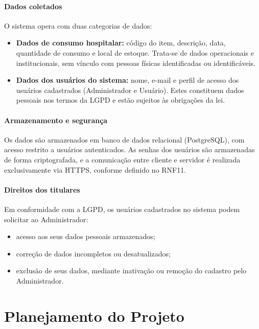 \documentclass[12pt,a4paper]{article}
\begin{document}
\paragraph{Dados coletados}
O sistema opera com duas categorias de dados:

\begin{itemize}
    \item \textbf{Dados de consumo hospitalar:} código do item, descrição,
          data, quantidade de consumo e local de estoque. Trata-se de dados
          operacionais e institucionais, sem vínculo com pessoas físicas
          identificadas ou identificáveis.

    \item \textbf{Dados dos usuários do sistema:} nome, e-mail e perfil de
          acesso dos usuários cadastrados (Administrador e Usuário). Estes
          constituem dados pessoais nos termos da LGPD e estão sujeitos às
          obrigações da lei.
\end{itemize}

\paragraph{Armazenamento e segurança}
Os dados são armazenados em banco de dados relacional (PostgreSQL), com
acesso restrito a usuários autenticados. As senhas dos usuários são
armazenadas de forma criptografada, e a comunicação entre cliente e
servidor é realizada exclusivamente via HTTPS, conforme definido no RNF11.

\paragraph{Direitos dos titulares}
Em conformidade com a LGPD, os usuários cadastrados no sistema podem
solicitar ao Administrador:
\begin{itemize}
    \item acesso aos seus dados pessoais armazenados;
    \item correção de dados incompletos ou desatualizados;
    \item exclusão de seus dados, mediante inativação ou remoção do
          cadastro pelo Administrador.
\end{itemize}

\section{Planejamento do Projeto}
\end{document}
